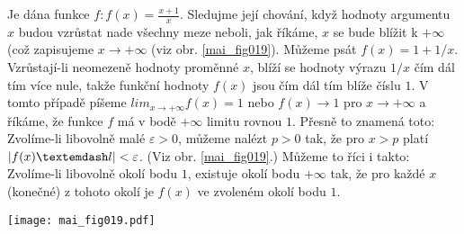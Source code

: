 \wikitextrule
\begin{example}\label{MAI:exam030}
  Je dána funkce \(f: f(x) = \frac{x + 1}{x}\). Sledujme její chování, když hodnoty argumentu \(x\) 
  budou vzrůstat nade všechny meze neboli, jak říkáme, \(x\) se bude blížit k \(+\infty\) (což 
  zapisujeme \(x \to + \infty\) (viz obr. \ref{mai_fig019}). Můžeme psát \(f(x) = 1 + 1/x\). 
  Vzrůstají-li neomezeně hodnoty proměnné \(x\), blíží se hodnoty výrazu \(1/x\) čím dál tím více 
  nule, takže funkční hodnoty \(f(x)\) jsou čím dál tím blíže číslu \(1\). V tomto případě píšeme 
  \(lim_{x\to+\infty} f(x) = 1\) nebo \(f(x) \to 1\) pro \(x\to +\infty\) a říkáme, že funkce \(f\) 
  má v bodě \(+\infty\) limitu rovnou \(1\). Přesně to znamená toto: Zvolíme-li libovolně malé 
  \(\varepsilon > 0\), můžeme nalézt \(p > 0\) tak, že pro \(x > p\) platí \(\abs{f(x) — l} < 
  \varepsilon\). (Viz obr. \ref{mai_fig019}.) Můžeme to říci i takto: Zvolíme-li libovolně okolí 
  bodu \(1\), existuje okolí bodu \(+\infty\) tak, že pro každé \(x\) (konečné) z tohoto okolí je 
  \(f(x)\) ve zvoleném okolí bodu \(1\).
  
  {\centering
   \captionsetup{type=figure}
%   
   \texttt{[image: mai\_fig019.pdf]}
  \par}
\end{example}















